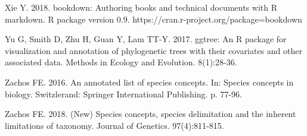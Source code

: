 Xie Y. 2018. bookdown: Authoring books and technical documents with R markdown. R package version 0.9. https://cran.r-project.org/package=bookdown

Yu G, Smith D, Zhu H, Guan Y, Lam TT-Y. 2017. ggtree: An R package for visualization and annotation of phylogenetic trees with their covariates and other associated data. Methods in Ecology and Evolution. 8(1):28-36.

Zachos FE. 2016. An annotated list of species concepts. In: Species concepts in biology. Switzlerand: Springer International Publishing. p. 77-96.

Zachos FE. 2018. (New) Species concepts, species delimitation and the inherent limitations of taxonomy. Journal of Genetics. 97(4):811-815.

\setlength{\parindent}{0em}
\setlength{\leftskip}{0em}
\setlength{\parskip}{6pt}
\doublespacing
